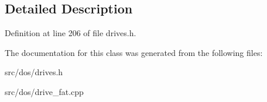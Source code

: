 \subsection{Detailed Description}


Definition at line 206 of file drives.\-h.



The documentation for this class was generated from the following files\-:\begin{DoxyCompactItemize}
\item 
src/dos/drives.\-h\item 
src/dos/drive\-\_\-fat.\-cpp\end{DoxyCompactItemize}
